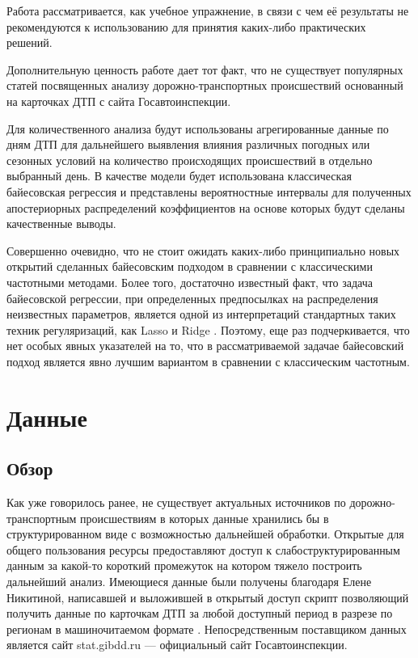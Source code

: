 \documentclass[a4paper, 14pt]{article}
\begin{document}
Работа рассматривается, как учебное упражнение, в связи с чем её результаты не рекомендуются к использованию для принятия каких-либо практических решений. 

Дополнительную ценность работе дает тот факт, что не существует популярных статей посвященных анализу дорожно-транспортных происшествий основанный на карточках ДТП с сайта Госавтоинспекции. 

Для количественного анализа будут использованы агрегированные данные по дням ДТП для дальнейшего выявления влияния различных погодных или сезонных условий на количество происходящих происшествий в отдельно выбранный день. В качестве модели будет использована классическая байесовская регрессия и представлены вероятностные интервалы для полученных апостериорных распределений коэффициентов на основе которых будут сделаны качественные выводы.

Совершенно очевидно, что не стоит ожидать каких-либо принципиально новых открытий сделанных байесовским подходом в сравнении с классическими частотными методами. Более того, достаточно известный факт, что задача байесовской регрессии, при определенных предпосылках на распределения неизвестных параметров, является одной из интерпретаций стандартных таких техник регуляризаций, как Lasso и Ridge \cite{haitovsky1980generalized}. Поэтому, еще раз подчеркивается, что нет особых явных указателей на то, что в рассматриваемой задачае байесовский подход является явно лучшим вариантом в сравнении с классическим частотным.

\section{Данные}
\subsection{Обзор}
Как уже говорилось ранее, не существует актуальных источников по дорожно-транспортным происшествиям в которых данные хранились бы в структурированном виде с возможностью дальнейшей обработки. Открытые для общего пользования ресурсы предоставляют доступ к слабоструктурированным данным за какой-то короткий промежуток на котором тяжело построить дальнейший анализ. Имеющиеся данные были получены благодаря Елене Никитиной, написавшей и выложившей в открытый доступ скрипт позволяющий получить данные по карточкам ДТП за любой доступный период в разрезе по регионам в машиночитаемом формате \cite{eleneGithub}. Непосредственным поставщиком данных является сайт stat.gibdd.ru --- официальный сайт Госавтоинспекции.
\end{document}
